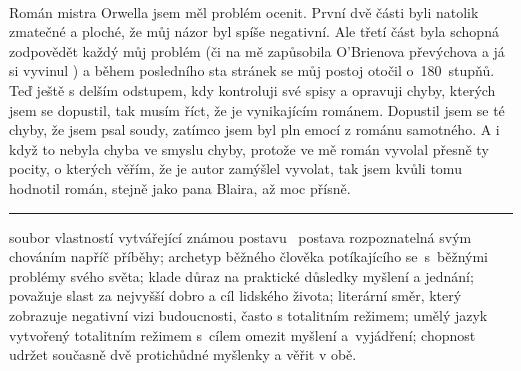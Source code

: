\documentclass[FGBook.tex]{subfiles}
\begin{document}
\vspace*{2em}\\
\noindent 
Román mistra Orwella jsem měl problém ocenit.
První dvě části byli natolik zmatečné a ploché, že můj názor byl spíše negativní.
Ale třetí část byla schopná zodpovědět každý můj problém (či na mě zapůsobila O’Brienova převýchova a já si vyvinul )
a během posledního sta stránek se můj postoj otočil o~180~stupňů. \\
Teď ještě s delším odstupem, kdy kontroluji své spisy a opravuji chyby, kterých jsem se dopustil,
tak musím říct, že je  vynikajícím románem.
Dopustil jsem se té chyby, že jsem psal soudy, zatímco jsem byl pln emocí z románu samotného.
A i když to nebyla chyba ve smyslu chyby, protože ve mě román vyvolal přesně ty pocity,
o kterých věřím, že je autor zamýšlel vyvolat,
tak jsem kvůli tomu hodnotil román, stejně jako pana Blaira, až moc přísně.



\vfill

\noindent\begin{minipage}{\textwidth}
	{\textcolor{\wpagecolor}{\rule{\linewidth}{0.4pt}}
		\footnotesize
		 soubor vlastností vytvářející známou postavu
		\textbfhl{$\Rightarrow$}~postava rozpoznatelná svým chováním napříč příběhy;
		 archetyp běžného člověka potíkajícího se~s~běžnými problémy svého světa;
		 klade důraz na praktické důsledky myšlení a jednání;
		 považuje slast za nejvyšší dobro a cíl lidského života;
		 literární směr, který zobrazuje negativní vizi budoucnosti, často s totalitním režimem;
		 umělý jazyk vytvořený totalitním režimem s~cílem omezit myšlení a~vyjádření;
		 chopnost udržet současně dvě protichůdné myšlenky a věřit v obě.
	}
\end{minipage}

\newpage
\end{document}
